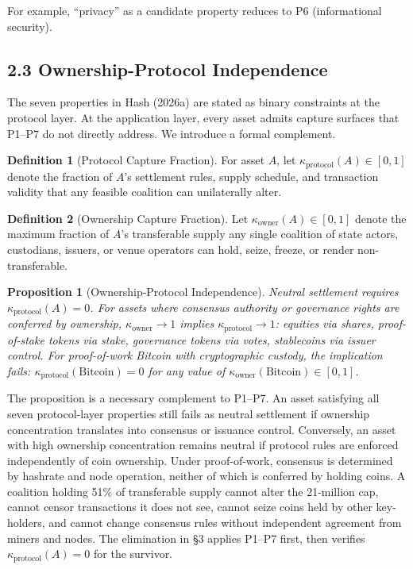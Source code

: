 \documentclass[12pt]{article}
\newtheorem{proposition}{Proposition}
\theoremstyle{definition}
\newtheorem{definition}{Definition}
\theoremstyle{remark}
\begin{document}
\noindent For example, ``privacy'' as a candidate property reduces to P6
(informational security).

\subsection{2.3 Ownership-Protocol Independence}

The seven properties in Hash (2026a) are stated as binary constraints
at the protocol layer. At the application layer, every asset admits
capture surfaces that P1--P7 do not directly address. We introduce a
formal complement.

\begin{definition}[Protocol Capture Fraction]
For asset $A$, let $\kappa_\text{protocol}(A) \in [0, 1]$ denote the
fraction of $A$'s settlement rules, supply schedule, and transaction
validity that any feasible coalition can unilaterally alter.
\end{definition}

\begin{definition}[Ownership Capture Fraction]
Let $\kappa_\text{owner}(A) \in [0, 1]$ denote the maximum fraction of
$A$'s transferable supply any single coalition of state actors,
custodians, issuers, or venue operators can hold, seize, freeze, or
render non-transferable.
\end{definition}

\begin{proposition}[Ownership-Protocol Independence]
Neutral settlement requires $\kappa_\text{protocol}(A) = 0$. For assets
where consensus authority or governance rights are conferred by
ownership, $\kappa_\text{owner} \to 1$ implies $\kappa_\text{protocol}
\to 1$: equities via shares, proof-of-stake tokens via stake,
governance tokens via votes, stablecoins via issuer control. For
proof-of-work Bitcoin with cryptographic custody, the implication
fails: $\kappa_\text{protocol}(\text{Bitcoin}) = 0$ for any value of
$\kappa_\text{owner}(\text{Bitcoin}) \in [0, 1]$.
\end{proposition}

\noindent The proposition is a necessary complement to P1--P7. An asset
satisfying all seven protocol-layer properties still fails as neutral
settlement if ownership concentration translates into consensus or
issuance control. Conversely, an asset with high ownership
concentration remains neutral if protocol rules are enforced
independently of coin ownership. Under proof-of-work, consensus is
determined by hashrate and node operation, neither of which is
conferred by holding coins. A coalition holding 51\% of transferable
supply cannot alter the 21-million cap, cannot censor transactions it
does not see, cannot seize coins held by other key-holders, and cannot
change consensus rules without independent agreement from miners and
nodes. The elimination in \S3 applies P1--P7 first, then verifies
$\kappa_\text{protocol}(A) = 0$ for the survivor.
\end{document}
